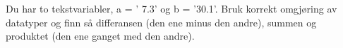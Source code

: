 %
%
Du har to tekstvariabler, a = ' 7.3' og b = '30.1'. Bruk korrekt omgjøring av datatyper og finn så differansen (den ene minus den andre), summen og produktet (den ene ganget med den andre).

